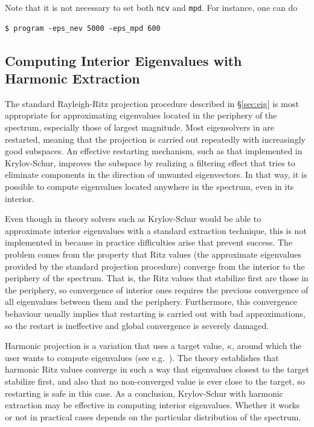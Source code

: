 Note that it is not necessary to set both \texttt{ncv} and \texttt{mpd}. For instance, one can do
\begin{Verbatim}[fontsize=\small]
	$ program -eps_nev 5000 -eps_mpd 600
\end{Verbatim}

\subsection{Computing Interior Eigenvalues with Harmonic Extraction}
\label{sec:harmonic}

The standard Rayleigh-Ritz projection procedure described in \S\ref{sec:eig} is most appropriate for approximating eigenvalues located in the periphery of the spectrum, especially those of largest magnitude. Most eigensolvers in \slepc are restarted, meaning that the projection is carried out repeatedly with increasingly good subspaces. An effective restarting mechanism, such as that implemented in Krylov-Schur, improves the subspace by realizing a filtering effect that tries to eliminate components in the direction of unwanted eigenvectors. In that way, it is possible to compute eigenvalues located anywhere in the spectrum, even in its interior.

Even though in theory solvers such as Krylov-Schur would be able to approximate interior eigenvalues with a standard extraction technique, this is not implemented in \slepc because in practice difficulties arise that prevent success. The problem comes from the property that Ritz values (the approximate eigenvalues provided by the standard projection procedure) converge from the interior to the periphery of the spectrum. That is, the Ritz values that stabilize first are those in the periphery, so convergence of interior ones requires the previous convergence of all eigenvalues between them and the periphery. Furthermore, this convergence behaviour usually implies that restarting is carried out with bad approximations, so the restart is ineffective and global convergence is severely damaged.

Harmonic projection is a variation that uses a target value, $\kappa$, around which the user wants to compute eigenvalues (see e.g.~\citep{Morgan:2006:HRA}). The theory establishes that harmonic Ritz values converge in such a way that eigenvalues closest to the target stabilize first, and also that no non-converged value is ever close to the target, so restarting is safe in this case. As a conclusion, Krylov-Schur with harmonic extraction may be effective in computing interior eigenvalues. Whether it works or not in practical cases depends on the particular distribution of the spectrum.

